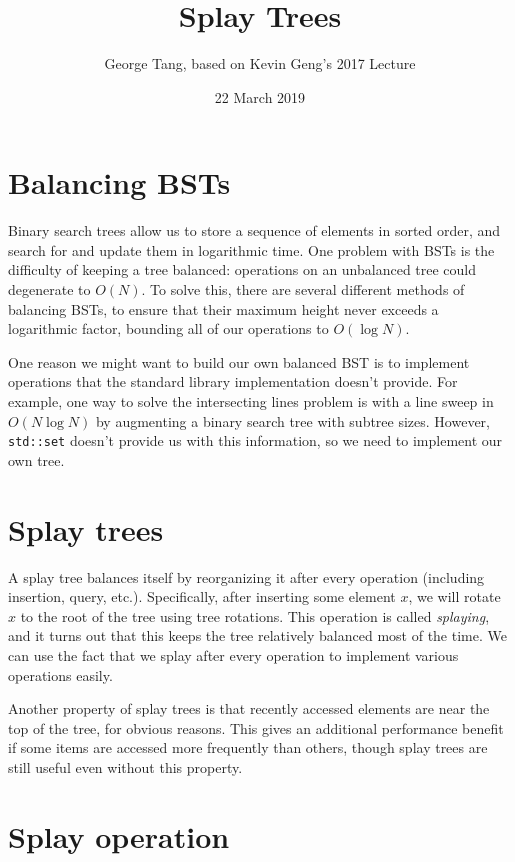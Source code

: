 \documentclass{article}
\title{Splay Trees}
\author{George Tang, based on Kevin Geng's 2017 Lecture}
\date{22 March 2019}
\begin{document}
\maketitle

\section{Balancing BSTs}

Binary search trees allow us to store a sequence of elements in sorted order, and search for and update them in logarithmic time. One problem with BSTs is the difficulty of keeping a tree balanced: operations on an unbalanced tree could degenerate to $O(N)$. To solve this, there are several different methods of balancing BSTs, to ensure that their maximum height never exceeds a logarithmic factor, bounding all of our operations to $O(\log N)$.

One reason we might want to build our own balanced BST is to implement operations that the standard library implementation doesn't provide. For example, one way to solve the intersecting lines problem is with a line sweep in $O(N \log N)$ by augmenting a binary search tree with subtree sizes. However, \verb|std::set| doesn't provide us with this information, so we need to implement our own tree.

\section{Splay trees}

A splay tree balances itself by reorganizing it after every operation (including insertion, query, etc.). Specifically, after inserting some element $x$, we will rotate $x$ to the root of the tree using tree rotations. This operation is called \textit{splaying}, and it turns out that this keeps the tree relatively balanced most of the time. We can use the fact that we splay after every operation to implement various operations easily.

Another property of splay trees is that recently accessed elements are near the top of the tree, for obvious reasons. This gives an additional performance benefit if some items are accessed more frequently than others, though splay trees are still useful even without this property.

\section{Splay operation}
\end{document}
